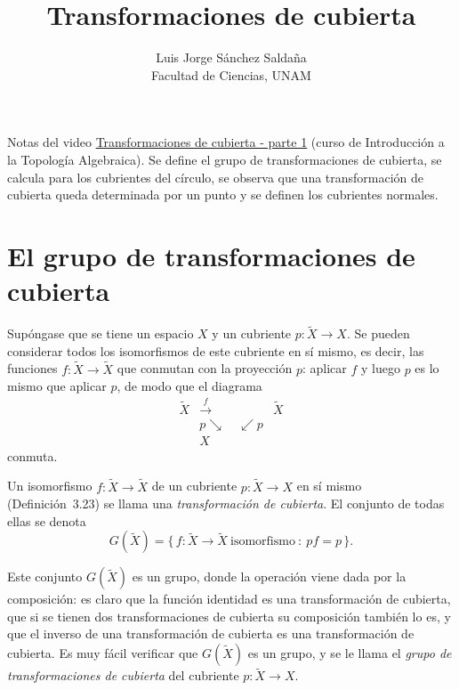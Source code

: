 \documentclass[11pt]{article}
\title{Transformaciones de cubierta}
\author{Luis Jorge Sánchez Saldaña\\[2pt]\small Facultad de Ciencias, UNAM}
\date{}
\begin{document}
\maketitle

\noindent\small Notas del video
\href{https://www.youtube.com/watch?v=pfpSL5NvOXk}{\guillemotleft{}Transformaciones de cubierta - parte 1\guillemotright{}}
(curso de Introducción a la Topología Algebraica). Se define el grupo de transformaciones de cubierta, se calcula para los cubrientes del círculo, se observa que una transformación de cubierta queda determinada por un punto y se definen los cubrientes normales.
\normalsize

\section*{El grupo de transformaciones de cubierta}

Supóngase que se tiene un espacio $X$ y un cubriente $p\colon\tilde X\to X$. Se pueden considerar todos los isomorfismos de este cubriente en sí mismo, es decir, las funciones $f\colon\tilde X\to\tilde X$ que conmutan con la proyección $p$: aplicar $f$ y luego $p$ es lo mismo que aplicar $p$, de modo que el diagrama
\[
  \begin{array}{ccc}
    \tilde X & \xrightarrow{\ f\ } & \tilde X\\[2pt]
    & {\scriptstyle p}\searrow\quad\swarrow{\scriptstyle p} & \\[2pt]
    & X &
  \end{array}
\]
conmuta.

\begin{defn}\label{def:transformacion}
Un isomorfismo $f\colon\tilde X\to\tilde X$ de un cubriente $p\colon\tilde X\to X$ en sí mismo (Definición~3.23) se llama una \emph{transformación de cubierta}. El conjunto de todas ellas se denota
\[
  G(\tilde X)=\{\,f\colon\tilde X\to\tilde X\ \text{isomorfismo}\ :\ pf=p\,\}.
\]
\end{defn}

Este conjunto $G(\tilde X)$ es un grupo, donde la operación viene dada por la composición: es claro que la función identidad es una transformación de cubierta, que si se tienen dos transformaciones de cubierta su composición también lo es, y que el inverso de una transformación de cubierta es una transformación de cubierta. Es muy fácil verificar que $G(\tilde X)$ es un grupo, y se le llama el \emph{grupo de transformaciones de cubierta} del cubriente $p\colon\tilde X\to X$.
\end{document}
